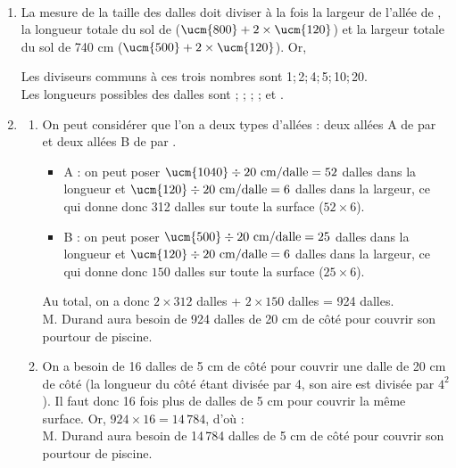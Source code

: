 \begin{corrige}
\ \\ [-5mm]
  \begin{enumerate}
      \item La mesure de la taille des dalles doit diviser à la fois la largeur de l'allée de , la longueur totale du sol de  ($\ucm{800}+2\times\ucm{120}$) et la largeur totale du sol de 740 cm ($\ucm{500}+2\times\ucm{120}$). Or, \\
      Les diviseurs communs à ces trois nombres sont 1;\,2;\,4;\,5;\,10;\,20. \\
      {\blue Les longueurs possibles des dalles sont  ;   ;  ;  ;  et .}
      \item
      \begin{enumerate}
         \item On peut considérer que l'on a deux types d'allées : deux allées A de  par  et deux allées B de  par .
         \begin{itemize}
            \item A : on peut poser $\ucm{1040}\div20 \text{ cm/dalle} =52$ dalles dans la longueur et $\ucm{120}\div20\text{ cm/dalle} =6$ dalles dans la largeur, ce qui donne donc 312 dalles sur toute la surface ($52\times6$).
            \item B : on peut poser $\ucm{500}\div20 \text{ cm/dalle}=25$ dalles dans la longueur et $\ucm{120}\div20\text{ cm/dalle} =6$ dalles dans la largeur, ce qui donne donc $150$ dalles sur toute la surface ($25\times6$).
         \end{itemize}
         Au total, on a donc $2\times312$ dalles + $2\times150$ dalles = 924 dalles. \\
         {\blue M. Durand aura besoin de 924 dalles de 20 cm de côté pour couvrir son pourtour de piscine.}
         \item On a besoin de 16 dalles de 5 cm de côté pour couvrir une dalle de 20 cm de côté (la longueur du côté étant divisée par 4, son aire est divisée par $4^2$). Il faut donc 16 fois plus de dalles de 5 cm pour couvrir la même surface. Or, $924\times16 =14\,784$, d'où : \\
         {\blue M. Durand aura besoin de 14\,784 dalles de 5 cm de côté pour couvrir son pourtour de piscine.}
      \end{enumerate}
   \end{enumerate}
\end{corrige}



